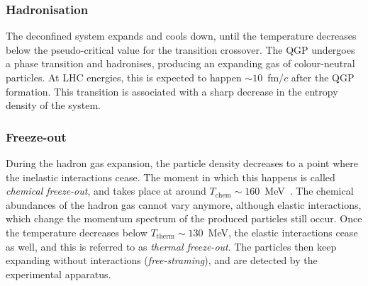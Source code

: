 \subsubsection{Hadronisation}
The deconfined system expands and cools down, until the temperature decreases below the pseudo-critical value for the transition crossover. The QGP undergoes a phase transition and hadronises, producing an expanding gas of colour-neutral particles. At LHC energies, this is expected to happen $\sim 10$~fm/$c$ after the QGP formation. This transition is associated with a sharp decrease in the entropy density of the system.

\subsubsection{Freeze-out}
During the hadron gas expansion, the particle density decreases to a point where the inelastic interactions cease. The moment in which this happens is called \emph{chemical freeze-out}, and takes place at around $T_\mathrm{chem}\sim160$~MeV~\cite{Andronic:2017pug}. The chemical abundances of the hadron gas cannot vary anymore, although elastic interactions, which change the momentum spectrum of the produced particles still occur. Once the temperature decreases below $T_\mathrm{therm}\sim 130$~MeV, the elastic interactions cease as well, and this is referred to as \emph{thermal freeze-out}. The particles then keep expanding without interactions (\emph{free-straming}), and are detected by the experimental apparatus.

